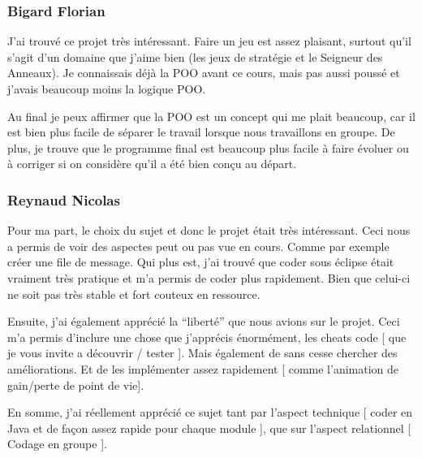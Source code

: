 \documentclass{article}
\begin{document}
  \subsubsection{Bigard Florian}
  J'ai trouvé ce projet très intéressant.
  Faire un jeu est assez plaisant, surtout qu'il s'agit d'un domaine que j'aime bien (les jeux de stratégie et le Seigneur des Anneaux).
  Je connaissais déjà la POO avant ce cours, mais pas aussi poussé et j'avais beaucoup moins la logique POO.

  Au final je peux affirmer que la POO est un concept qui me plait beaucoup, car il est bien plus facile de séparer le travail lorsque nous travaillons en groupe.
  De plus, je trouve que le programme final est beaucoup plus facile à faire évoluer ou à corriger si on considère qu'il a été bien conçu au départ.

  \subsubsection{Reynaud Nicolas}
  Pour ma part, le choix du sujet et donc le projet était très intéressant.
  Ceci nous a permis de voir des aspectes peut ou pas vue en cours. Comme par exemple créer une file de message.
  Qui plus est, j'ai trouvé que coder sous éclipse était vraiment très pratique et m'a permis de coder plus rapidement. Bien que celui-ci ne soit pas très stable
  et fort couteux en ressource.

  Ensuite, j'ai également apprécié la ``liberté'' que nous avions sur le projet. Ceci m'a permis d'inclure une chose que j'apprécis énormément,
  les cheats code [ que je vous invite a découvrir / tester ]. Mais également de sans cesse chercher des améliorations. Et de les implémenter assez rapidement 
  [ comme l'animation de gain/perte de point de vie].

  En somme, j'ai réellement apprécié ce sujet tant par l'aspect technique [ coder en Java et de façon assez rapide pour chaque module ], 
  que sur l'aspect relationnel [ Codage en groupe ].

  
\end{document}
